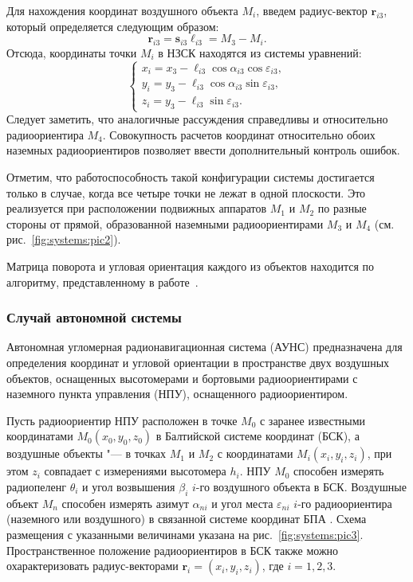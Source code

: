 \documentclass[../main.tex]{subfiles}
\begin{document}
Для нахождения координат воздушного объекта $M_i$, введем радиус-вектор $\mathbf{r}_{i3}$, который определяется следующим образом:
\begin{equation}
    \mathbf{r}_{i3} = \mathbf{s}_{i3} \ell_{i3} = M_3 - M_i.
\end{equation}
Отсюда, координаты точки $M_i$ в НЗСК находятся из системы уравнений:
\begin{equation}
    \begin{cases}
        x_i = x_3 - \ell_{i3} \cos\alpha_{i3} \cos\varepsilon_{i3}, \\
        y_i = y_3 - \ell_{i3} \cos\alpha_{i3} \sin\varepsilon_{i3}, \\
        z_i = y_3 - \ell_{i3} \sin\varepsilon_{i3}.
    \end{cases}
\end{equation}
Следует заметить, что аналогичные рассуждения справедливы и относительно радиоориентира $M_4$. Совокупность расчетов координат относительно обоих наземных радиоориентиров позволяет ввести дополнительный контроль ошибок.

Отметим, что работоспособность такой конфигурации системы достигается только в случае, когда все четыре точки не лежат в одной плоскости. Это реализуется при расположении подвижных аппаратов $M_1$ и $M_2$ по разные стороны от прямой, образованной наземными радиоориентирами $M_3$ и $M_4$ (см. рис.~\ref{fig:systems:pic2}).

Матрица поворота и угловая ориентация каждого из объектов находится по алгоритму, представленному в работе~\cite{antennas}.

\subsubsection{Случай автономной системы}
Автономная угломерная радионавигационная система (АУНС) предназначена для определения координат и угловой ориентации в пространстве двух воздушных объектов, оснащенных высотомерами и бортовыми радиоориентирами с наземного пункта управления (НПУ), оснащенного радиоориентиром.

Пусть радиоориентир НПУ расположен в точке $M_0$ с заранее известными координатами $M_0\left(x_0, y_0, z_0\right)$ в Балтийской системе координат (БСК), а воздушные объекты "--- в точках $M_1$ и $M_2$ с координатами $M_i\left(x_i, y_i, z_i\right)$, при этом $z_i$ совпадает с измерениями высотомера $h_i$. НПУ $M_0$ способен измерять радиопеленг $\theta_i$ и угол возвышения $\beta_i$ $i$-го воздушного объекта в БСК. Воздушные объект $M_n$ способен измерять азимут $\alpha_{ni}$ и угол места $\varepsilon_{ni}$ $i$-го радиоориентира (наземного или воздушного) в связанной системе координат БПА \cite{antennas}. Схема размещения с указанными величинами указана на рис.~\ref{fig:systems:pic3}. Пространственное положение радиоориентиров в БСК также можно охарактеризовать радиус-векторами $\mathbf{r}_i = \left(x_i, y_i, z_i\right)$, где $i = 1,2,3$.
\end{document}
